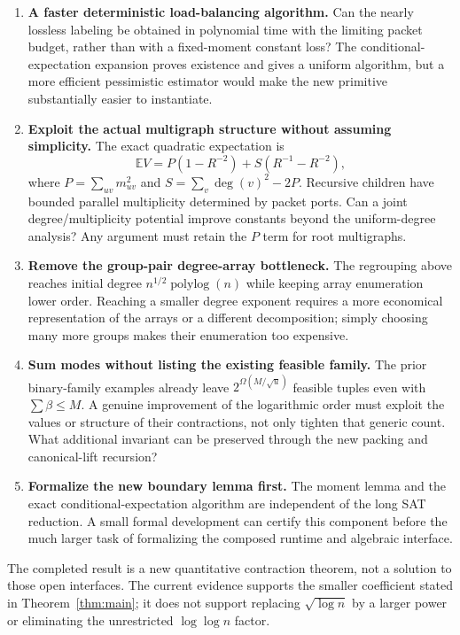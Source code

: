 \documentclass[11pt]{article}
\theoremstyle{remark}\newtheorem{remark}[theorem]{Remark}
\newcommand{\polylog}{\operatorname{polylog}}
\newcommand{\E}{\mathbb E}
\begin{document}
\begin{enumerate}[leftmargin=*]
\item \textbf{A faster deterministic load-balancing algorithm.} Can the nearly lossless labeling be obtained in polynomial time with the limiting packet budget, rather than with a fixed-moment constant loss? The conditional-expectation expansion proves existence and gives a uniform algorithm, but a more efficient pessimistic estimator would make the new primitive substantially easier to instantiate.
\item \textbf{Exploit the actual multigraph structure without assuming simplicity.} The exact quadratic expectation is
\[
 \E V=P(1-R^{-2})+S(R^{-1}-R^{-2}),
\]
where $P=\sum_{uv}m_{uv}^2$ and $S=\sum_v\deg(v)^2-2P$. Recursive children have bounded parallel multiplicity determined by packet ports. Can a joint degree/multiplicity potential improve constants beyond the uniform-degree analysis? Any argument must retain the $P$ term for root multigraphs.
\item \textbf{Remove the group-pair degree-array bottleneck.} The regrouping above reaches initial degree $n^{1/2}\polylog(n)$ while keeping array enumeration lower order. Reaching a smaller degree exponent requires a more economical representation of the arrays or a different decomposition; simply choosing many more groups makes their enumeration too expensive.
\item \textbf{Sum modes without listing the existing feasible family.} The prior binary-family examples already leave $2^{\Omega(M/\sqrt u)}$ feasible tuples even with $\sum\beta\le M$. A genuine improvement of the logarithmic order must exploit the values or structure of their contractions, not only tighten that generic count. What additional invariant can be preserved through the new packing and canonical-lift recursion?
\item \textbf{Formalize the new boundary lemma first.} The moment lemma and the exact conditional-expectation algorithm are independent of the long SAT reduction. A small formal development can certify this component before the much larger task of formalizing the composed runtime and algebraic interface.
\end{enumerate}

The completed result is a new quantitative contraction theorem, not a solution to those open interfaces. The current evidence supports the smaller coefficient stated in Theorem~\ref{thm:main}; it does not support replacing $\sqrt{\log n}$ by a larger power or eliminating the unrestricted $\log\log n$ factor.
\end{document}
